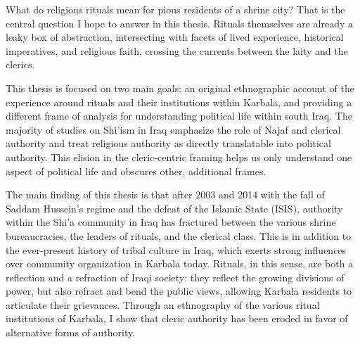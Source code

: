 
What do religious rituals mean for pious residents of a shrine city? That is the central question I hope to answer in this thesis. Rituals themselves are already a leaky box of abstraction, intersecting with facets of lived experience, historical imperatives, and religious faith, crossing the currents between the laity and the clerics.  


This thesis is focused on two main goals: an original ethnographic account of the experience around rituals and their institutions within Karbala, and providing a different frame of analysis for understanding political life within south Iraq. The majority of studies on Shi'ism in Iraq emphasize the role of Najaf and clerical authority and treat religious authority as directly translatable into political authority. This elision in the cleric-centric framing helps us only understand one aspect of political life and obscures other, additional frames. 

The main finding of this thesis is that after 2003 and 2014 with the fall of Saddam Hussein's regime and the defeat of the Islamic State (ISIS), authority within the Shi'a community in Iraq has fractured between the various shrine  bureaucracies, the leaders of rituals, and the clerical class. This is in addition to the ever-present history of tribal culture in Iraq, which exerts strong influences over community organization in Karbala today. Rituals, in this sense, are both a reflection and a refraction of Iraqi society: they reflect the growing divisions of power, but also refract and bend the public views, allowing Karbala residents to articulate their grievances. Through an ethnography of the various ritual institutions of Karbala, I show that cleric authority has been eroded in favor of alternative forms of authority. 

